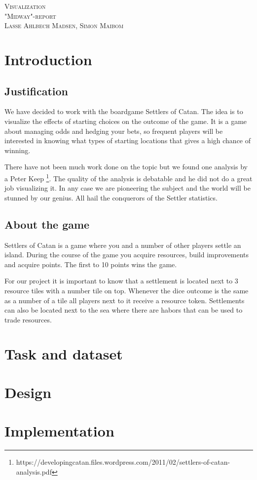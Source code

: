 \documentclass{article}
\begin{document}
\begin{center}
\textsc{\Large Visualization}\\[0.5cm]
\textsc{\large "Midway"-report}\\[0.5cm]
\textsc{\large Lasse Ahlbech Madsen, Simon Maibom}\\[0.5cm]
\vspace{1 cm}
\end{center}

\section{Introduction}

\subsection{Justification}

We have decided to work with the boardgame Settlers of Catan. The idea is to
visualize the effects of starting choices on the outcome of the game. It is a
game about managing odds and hedging your bets, so frequent players will be
interested in knowing what types of starting locations that gives a high
chance of winning. 

There have not been much work done on the topic but we found one analysis by a 
Peter Keep
\footnote{https://developingcatan.files.wordpress.com/2011/02/settlers-of-catan-analysis.pdf}.
The quality of the analysis is debatable and he did not do a great job
visualizing it. In any case we are pioneering the subject and the world will
be stunned by our genius. All hail the conquerors of the Settler statistics.

\subsection{About the game}

Settlers of Catan is a game where you and a number of other players settle
an island. During the course of the game you acquire resources, build
improvements and acquire points. The first to 10 points wins the game. 

For our project it is important to know that a settlement is located next
to 3 resource tiles with a number tile on top. Whenever the dice outcome is
the same as a number of a tile all players next to it receive a resource
token. Settlements can also be located next to the sea where there are habors
that can be used to trade resources.


\section{Task and dataset}


\section{Design}


\section{Implementation}
\end{document}
